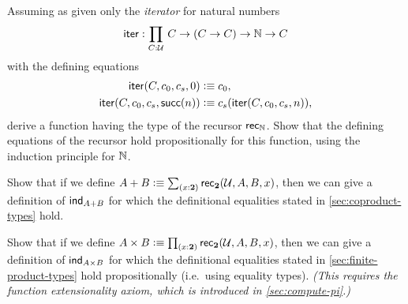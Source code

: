 \begin{solution}[Steven]
  
\end{solution}

\begin{solution}[Zack]
  
\end{solution}

\begin{ex}\label{ex:iterator}
Assuming as given only the \emph{iterator} for natural numbers
\[\ite : \prd{C:\UU} C \to (C \to C) \to \nat \to C \]
with the defining equations
\begin{align*}
\mathsf{iter}(C,c_0,c_s,0)  &\vcentcolon\equiv c_0, \\
\mathsf{iter}(C,c_0,c_s,\mathsf{succ}(n)) &\vcentcolon\equiv c_s(\mathsf{iter}(C,c_0,c_s,n)),
\end{align*}
derive a function having the type of the recursor $\mathsf{rec}_{\mathbb{N}}$.
Show that the defining equations of the recursor hold propositionally for this function, using the induction principle for $\mathbb{N}$.
\end{ex}

\begin{solution}[Alan]
  
\end{solution}

\begin{solution}[Daniel]
  
\end{solution}

\begin{ex}\label{ex:sum-via-bool}
%
Show that if we define $A + B \defeq \sm{x:\bool} \rec{\bool}(\UU,A,B,x)$, then we can give a definition of $\mathsf{ind}_{A+B}$ for which the definitional equalities stated in \cref{sec:coproduct-types} hold.
\end{ex}

\begin{solution}[Steven]
  
\end{solution}

\begin{solution}[Alex]
  
\end{solution}

\begin{solution}[James]
  
\end{solution}

\begin{ex}\label{ex:prod-via-bool}
%
Show that if we define $A \times B \defeq \prd{x:\bool}\rec{\bool}(\UU,A,B,x)$, then we can give a definition of  $\mathsf{ind}_{A\times B}$ for which the definitional equalities stated in \cref{sec:finite-product-types} hold propositionally (i.e.\ using equality types).
\emph{(This requires the function extensionality axiom, which is introduced in \cref{sec:compute-pi}.)}
\end{ex}


